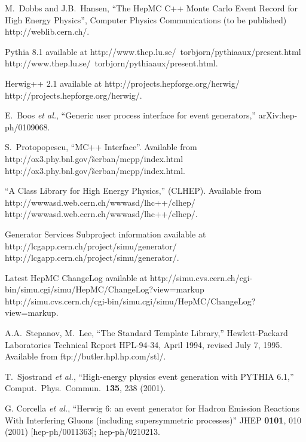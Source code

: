 \documentclass[11pt,letterpaper]{article}
\begin{document}
\begin{thebibliography}{99}

  M.~Dobbs and J.B.~Hansen, ``The HepMC C++ Monte Carlo Event Record for
  High Energy Physics'', Computer Physics Communications (to be
  published) 
  {http://weblib.cern.ch/}.  

  Pythia 8.1 available at \htmladdnormallink
  {http://www.thep.lu.se/~torbjorn/pythiaaux/present.html}
  {http://www.thep.lu.se/~torbjorn/pythiaaux/present.html}.

  Herwig++ 2.1 available at \htmladdnormallink
  {http://projects.hepforge.org/herwig/}
  {http://projects.hepforge.org/herwig/}.

E.~Boos {\it et al.},
``Generic user process interface for event generators,''
arXiv:hep-ph/0109068.

  S.~Protopopescu, ``MC++ Interface''.
  Available from \htmladdnormallink
  {http://ox3.phy.bnl.gov/\~serban/mcpp/index.html}
  {http://ox3.phy.bnl.gov/\~serban/mcpp/index.html}.

  ``A Class Library for High Energy Physics,'' (CLHEP).
  Available from 
  \htmladdnormallink
  {http://wwwasd.web.cern.ch/wwwasd/lhc++/clhep/}
  {http://wwwasd.web.cern.ch/wwwasd/lhc++/clhep/}.

   Generator Services Subproject information available at 
   \htmladdnormallink
  {http://lcgapp.cern.ch/project/simu/generator/}
  {http://lcgapp.cern.ch/project/simu/generator/}.

  Latest HepMC ChangeLog available at  \htmladdnormallink
  {http://simu.cvs.cern.ch/cgi-bin/simu.cgi/simu/HepMC/ChangeLog?view=markup}
  {http://simu.cvs.cern.ch/cgi-bin/simu.cgi/simu/HepMC/ChangeLog?view=markup}.

  A.A.~Stepanov, M.~Lee, ``The Standard Template Library,''
  Hewlett-Packard Laboratories Technical Report HPL-94-34, April 1994,
  revised July 7, 1995.
  Available from 
  {ftp://butler.hpl.hp.com/stl/}.

  T.~Sjostrand {\it et al.}, 
  ``High-energy physics event generation with PYTHIA 6.1,''
  Comput.\ Phys.\ Commun.\  {\bf 135}, 238 (2001).

   G. Corcella {\it et al.}, 
  ``Herwig 6: an event generator for Hadron Emission Reactions
  With Interfering Gluons (including supersymmetric processes)''
  JHEP {\bf 0101}, 010 (2001) [hep-ph/0011363]; hep-ph/0210213.


\end{thebibliography}
\end{document}
